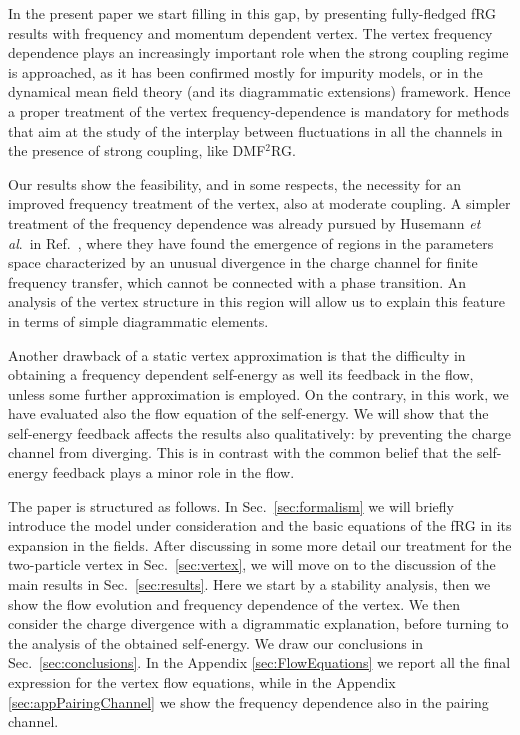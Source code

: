 In the present paper we start filling in this gap, by presenting fully-fledged fRG results with frequency and momentum dependent vertex.
The vertex frequency dependence plays an increasingly important role when the strong coupling regime is approached, as it has been confirmed mostly for impurity models,\cite{Kinza2013,Wentzell2016a} or in the dynamical mean field theory\cite{Metzner1989,Georges1992,Georges1996} (and its diagrammatic extensions)\cite{Rohringer2017} framework.\cite{Rohringer2012}
Hence a proper treatment of the vertex frequency-dependence is mandatory for methods that aim at the study of the interplay between fluctuations in all the channels in the presence of strong coupling, like DMF$^2$RG.\cite{Taranto2014} 

Our results show the feasibility, and in some respects, the necessity for an improved frequency treatment of the vertex, also at moderate coupling.
A simpler treatment of the frequency dependence was already pursued by Husemann \emph{et al}.~in Ref.~, where they have found the emergence of regions in the parameters space characterized by an unusual divergence in the charge channel for finite frequency transfer, which cannot be connected with a phase transition.
 An analysis of the vertex structure in this region will allow us to explain this feature in terms of simple diagrammatic elements. 

Another drawback of a static vertex approximation is that the difficulty in obtaining a frequency dependent self-energy as well its feedback in the flow, unless some further approximation is employed.\cite{Honerkamp2001}
On the contrary, in this work, we have evaluated also the flow equation of the self-energy. 
We will show that the self-energy feedback  affects the results also qualitatively: by preventing the charge channel from diverging. 
This is in contrast with the common belief that the self-energy feedback plays a minor role in the flow.

The paper is structured as follows. In Sec.~\ref{sec:formalism} we will briefly introduce the model under consideration and the basic equations of the fRG in its expansion in the fields.
After discussing in some more detail our treatment for the two-particle vertex  in Sec.~\ref{sec:vertex}, we will move on to the discussion of the main results in Sec.~\ref{sec:results}. Here we start by a stability analysis, then we show the flow evolution and frequency dependence of the vertex. We then consider the charge divergence with a digrammatic explanation, before turning to the analysis of the obtained self-energy. We draw our conclusions in Sec.~\ref{sec:conclusions}. In the Appendix \ref{sec:FlowEquations} we report all the final expression for the vertex flow equations, while in the Appendix \ref{sec:appPairingChannel} we show the frequency dependence also in the pairing channel.

